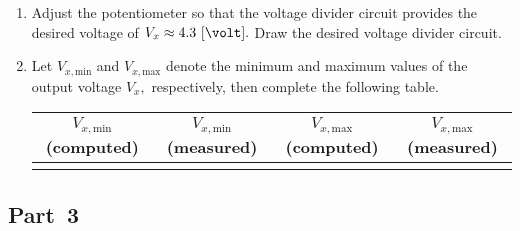 \begin{enumerate}
  
\item Adjust the potentiometer so that the voltage divider circuit provides the desired voltage of $V_x\approx 4.3~[\volt].$ Draw the desired voltage divider circuit. 


\item Let $V_{x,\text{min}}$ and $V_{x,\text{max}}$ denote the minimum and maximum values of the output voltage $V_x,$ respectively, then complete the following table.


  \begin{center}
  \begin{tabular}{|c|c|c|c|}
    \toprule
    $V_{x,\text{min}}$ (computed) & $V_{x,\text{min}}$ (measured)  & $V_{x,\text{max}}$ (computed) & $V_{x,\text{max}}$ (measured)\\
    \hline
    &&&\\
    \bottomrule
  \end{tabular}    
  \end{center}

  
\end{enumerate}

\subsection{Part~3}
\label{sec:part3}

